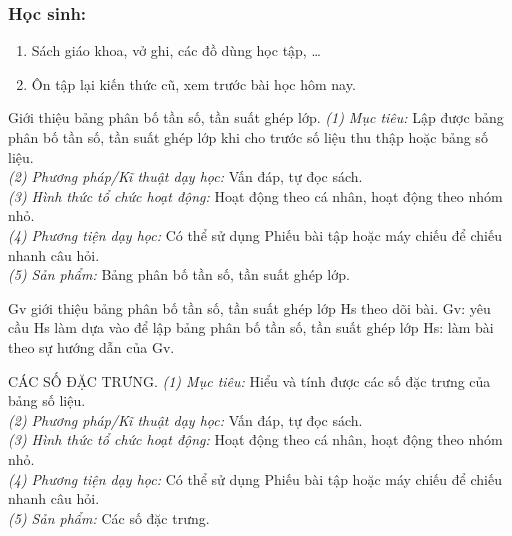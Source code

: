 \subsubsection{Học sinh:} 
\begin{enumerate}
	\item Sách giáo khoa, vở ghi, các đồ dùng học tập, \ldots
	\item Ôn tập lại kiến thức cũ, xem trước bài học hôm nay.
\end{enumerate}
\begin{kt}{Giới thiệu bảng phân bố tần số, tần suất ghép lớp.}
\textit{(1) Mục tiêu:} Lập được bảng phân bố tần số, tần suất ghép lớp khi cho trước số liệu thu thập hoặc bảng số liệu.\\
\textit{(2) Phương pháp/Kĩ thuật dạy học:} Vấn đáp, tự đọc sách.\\
\textit{(3) Hình thức tổ chức hoạt động:} Hoạt động theo cá nhân, hoạt động theo nhóm nhỏ.\\
\textit{(4) Phương tiện dạy học:} Có thể sử dụng Phiếu bài tập hoặc máy chiếu để chiếu nhanh câu hỏi.\\
\textit{(5) Sản phẩm:} Bảng phân bố tần số, tần suất ghép lớp.
\end{kt}
\begin{bang}{2}
\gvhs
{Gv giới thiệu bảng phân bố tần số, tần suất ghép lớp} 
{Hs theo dõi bài.}
\gvhs
{Gv: yêu cầu Hs làm  dựa vào  để lập bảng phân bố tần số, tần suất ghép lớp}
{Hs: làm bài theo sự hướng dẫn của Gv.}
\end{bang}
\begin{kt}{CÁC SỐ ĐẶC TRƯNG.}
\textit{(1) Mục tiêu:} Hiểu và tính được các số đặc trưng của bảng số liệu.\\
\textit{(2) Phương pháp/Kĩ thuật dạy học:} Vấn đáp, tự đọc sách.\\
\textit{(3) Hình thức tổ chức hoạt động:} Hoạt động theo cá nhân, hoạt động theo nhóm nhỏ.\\
\textit{(4) Phương tiện dạy học:} Có thể sử dụng Phiếu bài tập hoặc máy chiếu để chiếu nhanh câu hỏi.\\
\textit{(5) Sản phẩm:} Các số đặc trưng.
\end{kt}

